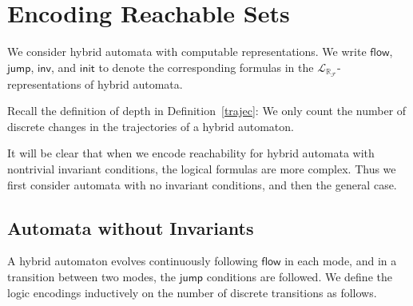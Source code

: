 \documentclass[envcountsect]{llncs}
\newcommand{\flow}{\mathsf{flow}}
\newcommand{\jump}{\mathsf{jump}}
\newcommand{\inv}{\mathsf{inv}}
\newcommand{\init}{\mathsf{init}}
\newcommand{\lrf}{\mathcal{L}_{\mathbb{R}_{\mathcal{F}}}}
\begin{document}
\section{Encoding Reachable Sets}

We consider hybrid automata with computable representations. We write $\flow$, $\jump$, $\inv$, and $\init$ to denote the corresponding formulas in the $\lrf$-representations of hybrid automata. 

\begin{remark}
Recall the definition of depth in Definition~\ref{trajec}: We only count the number of discrete changes in the trajectories of a hybrid automaton. 
\end{remark}

It will be clear that when we encode reachability for hybrid automata with nontrivial invariant conditions, the logical formulas are more complex. Thus we first consider automata with no invariant conditions, and then the general case. 


\subsection{Automata without Invariants}

A hybrid automaton evolves continuously following $\flow$ in each mode, and in a transition between two modes, the $\jump$ conditions are followed. We define the logic encodings inductively on the number of discrete transitions as follows. 
\end{document}
